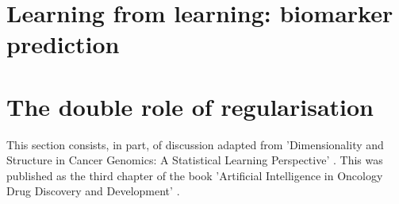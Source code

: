 \documentclass[../thesis.tex]{subfiles}
\begin{document}
\section{Learning from learning: biomarker prediction}
\section{The double role of regularisation}
This section consists, in part, of discussion adapted from 'Dimensionality and Structure in Cancer Genomics: A Statistical Learning Perspective' \citep{bradley_dimensionality_2020}. This was published as the third chapter of the book 'Artificial Intelligence in Oncology Drug Discovery and Development' \citep{cassidy_artificial_2020}.

\dobib %
\end{document}
